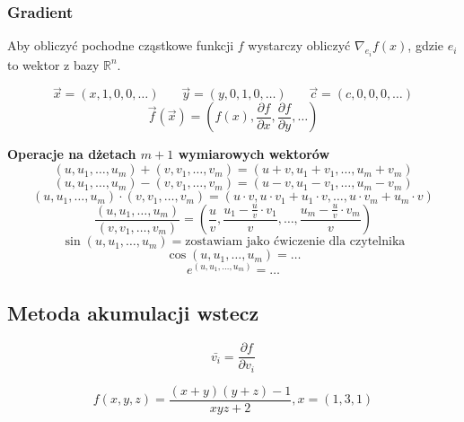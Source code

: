 \documentclass[../mn-notatki.tex]{subfiles}
\begin{document}
\subsubsection{Gradient}
Aby obliczyć pochodne cząstkowe funkcji $f$ wystarczy obliczyć
$\nabla_{e_i}f(x)$,
gdzie $e_i$ to wektor z bazy $\mathbb{R}^n$.

\begin{tcolorbox}
\[
\vec{x} = (x, 1, 0, 0, \ldots) ~~~~~~~~ \vec{y} = (y, 0, 1, 0, \ldots) ~~~~~~~~ \vec{c} = (c, 0, 0, 0, \ldots)
\]
\[
\vec{f}(\vec{x}) = \left(f(x), \frac{\partial f}{\partial x}, \frac{\partial f}{\partial y}, \ldots \right)
\]
\end{tcolorbox}

\begin{tcolorbox}
\textbf{Operacje na dżetach $m+1$ wymiarowych wektorów}
    $$(u,u_1,\ldots, u_m) + (v,v_1,\ldots, v_m) = (u + v, u_1 + v_1, \ldots, u_m + v_m)$$
    $$(u,u_1,\ldots, u_m) - (v,v_1,\ldots, v_m) = (u - v, u_1 - v_1, \ldots, u_m - v_m)$$
    $$(u,u_1,\ldots, u_m) \cdot (v,v_1,\ldots, v_m) = (u \cdot v, u \cdot v_1 + u_1 \cdot v, \ldots, u \cdot v_m + u_m \cdot v)$$
    $$\frac{(u,u_1,\ldots, u_m)}{(v,v_1,\ldots, v_m)} = \left(\frac{u}{v}, \frac{u_1 - \frac{u}{v}\cdot v_1}{v}, \ldots, \frac{u_m - \frac{u}{v}\cdot v_m}{v}\right)$$
    $$\sin(u,u_1,\ldots, u_m) = \text{zostawiam jako ćwiczenie dla czytelnika}$$
    $$\cos(u,u_1,\ldots, u_m) = \ldots$$
    $$e^{(u,u_1,\ldots, u_m)} = \ldots$$
\end{tcolorbox}

\subsection{Metoda akumulacji wstecz}
\begin{tcolorbox}
\[
\bar{v_i} = \frac{\partial f}{\partial v_i}
\]
\end{tcolorbox}
\begin{tcolorbox}
\[
f(x, y, z) = \frac{(x+y)(y+z) - 1}{xyz + 2}, x = (1, 3, 1)
\]
\end{tcolorbox}
\end{document}
